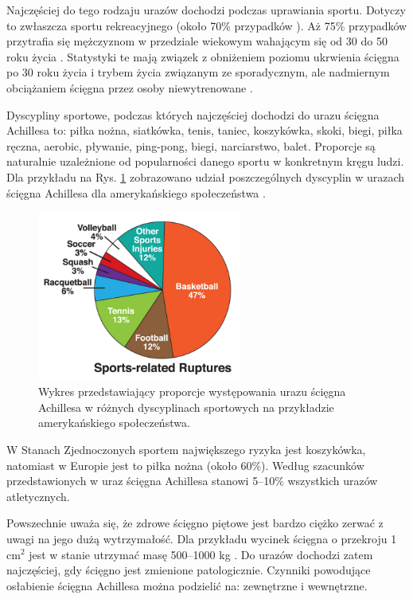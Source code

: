 Najczęściej do tego rodzaju urazów dochodzi podczas uprawiania sportu. Dotyczy to zwłaszcza sportu rekreacyjnego (około 70\% przypadków \cite{EpidemiologyUS, Etiologia}).
Aż 75\% przypadków przytrafia się mężczyznom w przedziale wiekowym wahającym się od 30 do 50 roku życia \cite{Etiologia}. Statystyki te mają związek z obniżeniem poziomu ukrwienia ścięgna po 30 roku życia i trybem życia związanym ze sporadycznym, ale nadmiernym obciążaniem ścięgna przez osoby niewytrenowane \cite{Etiologia}. 

Dyscypliny sportowe, podczas których najczęściej dochodzi do urazu ścięgna Achillesa to: piłka nożna, siatkówka, tenis, taniec, koszykówka, skoki, biegi, piłka ręczna, aerobic, pływanie, ping-pong, biegi, narciarstwo, balet. Proporcje są naturalnie uzależnione od popularności danego sportu w konkretnym kręgu ludzi. Dla przykładu na Rys. \ref{rupture} zobrazowano udział poszczególnych dyscyplin w urazach ścięgna Achillesa dla amerykańskiego społeczeństwa \cite{EpidemiologyUS}. 

\begin{figure}[h!]
	\centering
	\includegraphics[width=0.6\textwidth]{figures/Achilles_zerwanie.jpg}
	\caption{Wykres przedstawiający proporcje występowania urazu ścięgna Achillesa w różnych dyscyplinach sportowych na przykładzie amerykańskiego społeczeństwa.}
	\label{rupture}
\end{figure}
W Stanach Zjednoczonych sportem największego ryzyka jest koszykówka, natomiast w Europie jest to piłka nożna (około 60\%). Według szacunków przedstawionych w \cite{CHIRALI2014211} uraz ścięgna Achillesa stanowi 5--10\% wszystkich urazów atletycznych.

Powszechnie uważa się, że zdrowe ścięgno piętowe jest bardzo ciężko zerwać z uwagi na jego dużą wytrzymałość. Dla przykładu wycinek ścięgna o przekroju 1 cm$^2$ jest w stanie utrzymać masę 500--1000 kg \cite{Maquirriain2011}. Do urazów dochodzi zatem najczęściej, gdy ścięgno jest zmienione patologicznie. Czynniki powodujące osłabienie ścięgna Achillesa można podzielić na: zewnętrzne i wewnętrzne.

